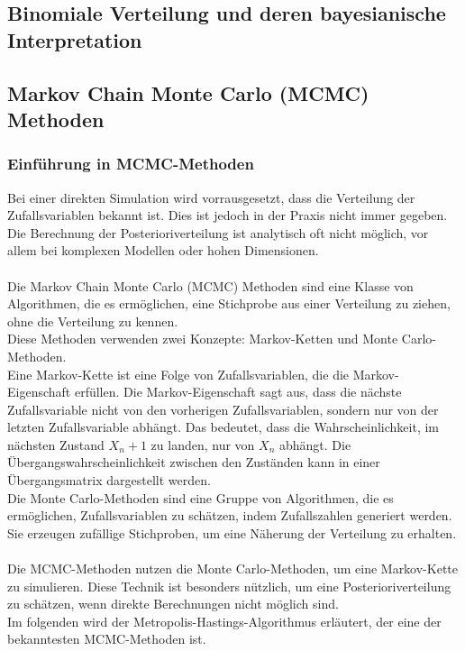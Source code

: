 \documentclass[a4paper,12pt]{article}
\begin{document}
\newpage

\subsection{Binomiale Verteilung und deren bayesianische Interpretation}
\newpage

\subsection{Markov Chain Monte Carlo (MCMC) Methoden}
\subsubsection{Einführung in MCMC-Methoden}
Bei einer direkten Simulation wird vorrausgesetzt, dass die Verteilung der Zufallsvariablen bekannt ist.
Dies ist jedoch in der Praxis nicht immer gegeben.
Die Berechnung der Posterioriverteilung ist analytisch oft nicht möglich, vor allem bei komplexen Modellen oder hohen Dimensionen. \\\\
Die Markov Chain Monte Carlo (MCMC) Methoden sind eine Klasse von Algorithmen, die es ermöglichen, eine Stichprobe aus einer Verteilung zu ziehen, ohne die Verteilung zu kennen. \parencite[179]{MonteCarloAlgorithmen} \\
Diese Methoden verwenden zwei Konzepte: Markov-Ketten und Monte Carlo-Methoden. \\
Eine Markov-Kette ist eine Folge von Zufallsvariablen, die die Markov-Eigenschaft erfüllen. 
Die Markov-Eigenschaft sagt aus, dass die nächste Zufallsvariable nicht von den vorherigen Zufallsvariablen, sondern nur von der letzten Zufallsvariable abhängt. 
Das bedeutet, dass die Wahrscheinlichkeit, im nächsten Zustand $X_n+1$ zu landen, nur von $X_n$ abhängt. 
Die Übergangswahrscheinlichkeit zwischen den Zuständen kann in einer Übergangsmatrix dargestellt werden. \parencite[188f.]{MonteCarloAlgorithmen} \\
Die Monte Carlo-Methoden sind eine Gruppe von Algorithmen, die es ermöglichen, Zufallsvariablen zu schätzen, indem Zufallszahlen generiert werden. 
Sie erzeugen zufällige Stichproben, um eine Näherung der Verteilung zu erhalten. \parencite[14f.]{MonteCarloAlgorithmen} \\\\
Die MCMC-Methoden nutzen die Monte Carlo-Methoden, um eine Markov-Kette zu simulieren. Diese Technik ist besonders nützlich, um eine Posterioriverteilung zu schätzen, wenn direkte Berechnungen nicht möglich sind. \parencite[179]{MonteCarloAlgorithmen} \\
Im folgenden wird der Metropolis-Hastings-Algorithmus erläutert, der eine der bekanntesten MCMC-Methoden ist.
\newpage
\end{document}
